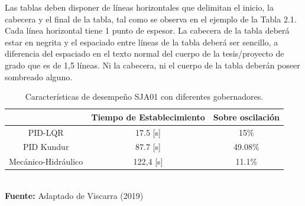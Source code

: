 Las tablas deben disponer de líneas horizontales que delimitan el inicio, la cabecera y el final de la tabla, tal como se observa en el ejemplo de la Tabla 2.1. Cada línea horizontal tiene 1 punto de espesor. La cabecera de la tabla deberá estar en negrita y el espaciado entre líneas de la tabla deberá ser sencillo, a diferencia del espaciado en el texto normal del cuerpo de la tesis/proyecto de grado que es de 1,5 líneas. Ni la cabecera, ni el cuerpo de la tabla deberán poseer sombreado alguno.

\begin{table}[h]
	\begin{center}
		\caption{Características de desempeño SJA01 con diferentes gobernadores.}
		\label{tab:tabla1}
		\begin{tabular}{c c c}
			\hline
			           & \textbf{Tiempo de Establecimiento} & \textbf{Sobre oscilación} \\ \hline
			PID-LQR    & 17.5 [s] & 15\%  \\
			PID Kundur & 87.7 [s] & 49.08\% \\
			Mecánico-Hidráulico & 122,4 [s] & 11.1\%  \\
			\hline
		\end{tabular}\\[0.5cm]
		\footnotesize{\textbf{Fuente:} Adaptado de Viscarra (2019)}
	\end{center}
\end{table}
